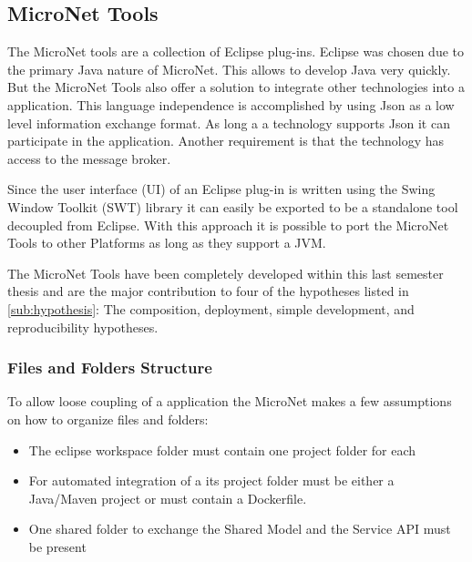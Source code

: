 \subsection{MicroNet Tools}
\label{sub:tools}

The MicroNet tools are a collection of Eclipse plug-ins. Eclipse was chosen due
to the primary Java nature of MicroNet. This allows to develop Java \mss{} very
quickly. But the MicroNet Tools also offer a solution to integrate other
technologies into a \ms{} application. This language independence is
accomplished by using Json as a low level information exchange format. As long a
a technology supports Json it can participate in the application. Another
requirement is that the technology has access to the message broker.

Since the user interface (UI) of an Eclipse plug-in is written using the Swing
Window Toolkit (SWT) library it can easily be exported to be a standalone tool
decoupled from Eclipse. With this approach it is possible to port the MicroNet
Tools to other Platforms as long as they support a JVM.

The MicroNet Tools have been completely developed within this last semester
thesis and are the major contribution to four of the hypotheses listed in
\autoref{sub:hypothesis}: The composition, deployment, simple development, and 
reproducibility hypotheses.

\subsubsection{Files and Folders Structure}

To allow loose coupling of a \ms{} application the MicroNet makes a few
assumptions on how to organize files and folders:

\begin{itemize}
  \item The eclipse workspace folder must contain one project folder for each
  \ms{}
  \item For automated integration of a \ms{} its project folder must be either a
  Java/Maven project or must contain a Dockerfile.
 \item One shared folder to exchange the Shared Model and the Service API must
 be present
\end{itemize}  

